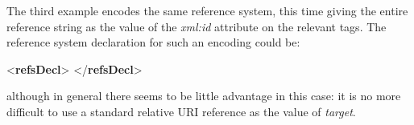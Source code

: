 The third example encodes the same reference system, this time giving the entire reference string as the value of the {\itshape xml:id} attribute on the relevant tags. The reference system declaration for such an encoding could be: \par\bgroup{}\exampleFont \begin{shaded}\noindent\mbox{}{<\textbf{refsDecl}>}\mbox{}\newline 
{}\mbox{}\newline 
{</\textbf{refsDecl}>}\end{shaded}\egroup\par \noindent  although in general there seems to be little advantage in this case: it is no more difficult to use a standard relative URI reference as the value of {\itshape target}.\par
